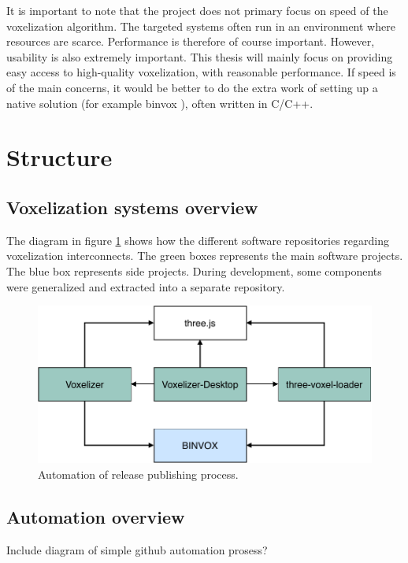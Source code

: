 It is important to note that the project does not primary focus on speed of the voxelization algorithm. The targeted systems often run in an environment where resources are scarce. Performance is therefore of course important. However, usability is also extremely important. This thesis will mainly focus on providing easy access to high-quality voxelization, with reasonable performance. If speed is of the main concerns, it would be better to do the extra work of setting up a native solution (for example binvox \cite{binvox}), often written in C/C++.

\section{Structure}
\subsection{Voxelization systems overview}
The diagram in figure \ref{fig:systems-overview} shows how the different software repositories regarding voxelization interconnects. The green boxes represents the main software projects. The blue box represents side projects. During development, some components were generalized and extracted into a separate repository.
\begin{figure}[h]
    \centering
    \includegraphics[page=1,scale=1]{sections/introduction/figures/systems-overview.pdf}
    \caption{Automation of release publishing process.}
    \label{fig:systems-overview}
\end{figure}

\subsection{Automation overview}
\colorbox{RubineRed}{Include diagram of simple github automation prosess?}


